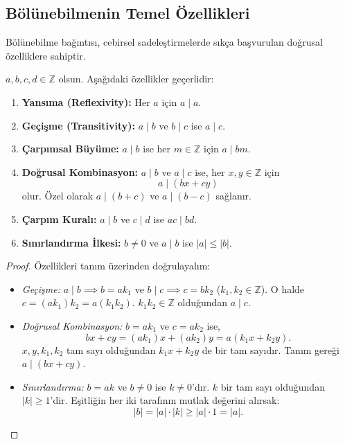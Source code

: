 \subsection{Bölünebilmenin Temel Özellikleri}

Bölünebilme bağıntısı, cebirsel sadeleştirmelerde sıkça başvurulan doğrusal özelliklere sahiptir.

\begin{theorem}
$a, b, c, d \in \mathbb{Z}$ olsun. Aşağıdaki özellikler geçerlidir:
\begin{enumerate}
    \item \textbf{Yansıma (Reflexivity):} Her $a$ için $a \mid a$.
    \item \textbf{Geçişme (Transitivity):} $a \mid b$ ve $b \mid c$ ise $a \mid c$.
    \item \textbf{Çarpımsal Büyüme:} $a \mid b$ ise her $m \in \mathbb{Z}$ için $a \mid bm$.
    \item \textbf{Doğrusal Kombinasyon:} $a \mid b$ ve $a \mid c$ ise, her $x, y \in \mathbb{Z}$ için
    \[
    a \mid (bx + cy)
    \]
    olur. Özel olarak $a \mid (b+c)$ ve $a \mid (b-c)$ sağlanır.
    \item \textbf{Çarpım Kuralı:} $a \mid b$ ve $c \mid d$ ise $ac \mid bd$.
    \item \textbf{Sınırlandırma İlkesi:} $b \neq 0$ ve $a \mid b$ ise $|a| \le |b|$.
\end{enumerate}
\end{theorem}

\begin{proof}
Özellikleri tanım üzerinden doğrulayalım:
\begin{itemize}
    \item \emph{Geçişme:} $a \mid b \implies b = a k_1$ ve $b \mid c \implies c = b k_2$ ($k_1, k_2 \in \mathbb{Z}$). O halde $c = (a k_1) k_2 = a (k_1 k_2)$. $k_1 k_2 \in \mathbb{Z}$ olduğundan $a \mid c$.
    \item \emph{Doğrusal Kombinasyon:} $b = a k_1$ ve $c = a k_2$ ise,
    \[
    bx + cy = (a k_1)x + (a k_2)y = a(k_1 x + k_2 y).
    \]
    $x, y, k_1, k_2$ tam sayı olduğundan $k_1 x + k_2 y$ de bir tam sayıdır. Tanım gereği $a \mid (bx + cy)$.
    \item \emph{Sınırlandırma:} $b = a k$ ve $b \neq 0$ ise $k \neq 0$'dır. $k$ bir tam sayı olduğundan $|k| \ge 1$'dir. Eşitliğin her iki tarafının mutlak değerini alırsak:
    \[
    |b| = |a| \cdot |k| \ge |a| \cdot 1 = |a|.
    \]
\end{itemize}
\end{proof}

